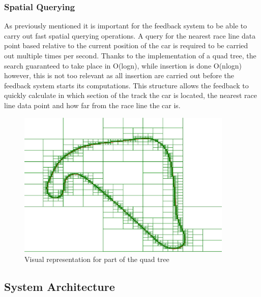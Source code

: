 \subsubsection{Spatial Querying}
As previously mentioned it is important for the feedback system to be able to carry out fast spatial querying operations. A query for the nearest race line data point based relative to the current position of the car is required to be carried out multiple times per second. Thanks to the implementation of a quad tree, the search guaranteed to take place in O(logn), while insertion is done O(nlogn) however, this is not too relevant as all insertion are carried out before the feedback system starts its computations. This structure allows the feedback to quickly calculate in which section of the track the car is located, the nearest race line data point and how far from the race line the car is.

\begin{figure}[!htb]
	\centering
	\includegraphics[height=7cm]{images/QuadTree}
	\caption{Visual representation for part of the quad tree}
	\label{fig:QuadTree}
\end{figure}

\subsection{System Architecture}

